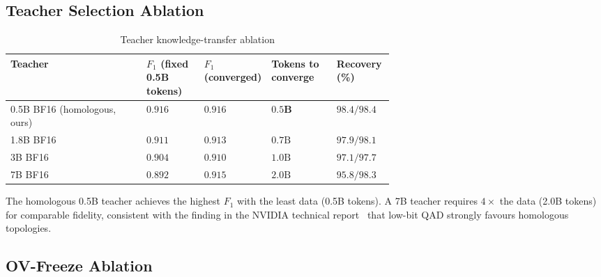 \documentclass[11pt, a4paper]{article}
\begin{document}
\subsection{Teacher Selection Ablation}

\begin{table}[htbp]
\centering
\caption{Teacher knowledge-transfer ablation}
\label{tab6-en}
\small
\renewcommand{\arraystretch}{1.15}
\begin{tabular}{l>{\centering\arraybackslash}p{0.15\linewidth}>{\centering\arraybackslash}p{0.17\linewidth}>{\centering\arraybackslash}p{0.17\linewidth}>{\centering\arraybackslash}p{0.15\linewidth}}
\toprule
\textbf{Teacher} & \textbf{$F_1$ (fixed 0.5B tokens)} & \textbf{$F_1$ (converged)} & \textbf{Tokens to converge} & \textbf{Recovery (\%)} \\
\midrule
0.5B BF16 (homologous, ours) & $\mathbf{0.916}$ & $\mathbf{0.916}$ & $\mathbf{0.5\text{B}}$ & $\mathbf{98.4} / \mathbf{98.4}$ \\
1.8B BF16 & $0.911$ & $0.913$ & $0.7\text{B}$ & $97.9 / 98.1$ \\
3B BF16 & $0.904$ & $0.910$ & $1.0\text{B}$ & $97.1 / 97.7$ \\
7B BF16 & $0.892$ & $0.915$ & $2.0\text{B}$ & $95.8 / 98.3$ \\
\bottomrule
\end{tabular}
\end{table}

The homologous 0.5B teacher achieves the highest $F_1$ with the least data (0.5B tokens). A 7B teacher requires $4\times$ the data (2.0B tokens) for comparable fidelity, consistent with the finding in the NVIDIA technical report~\cite{3} that low-bit QAD strongly favours homologous topologies.

\subsection{OV-Freeze Ablation}
\end{document}
